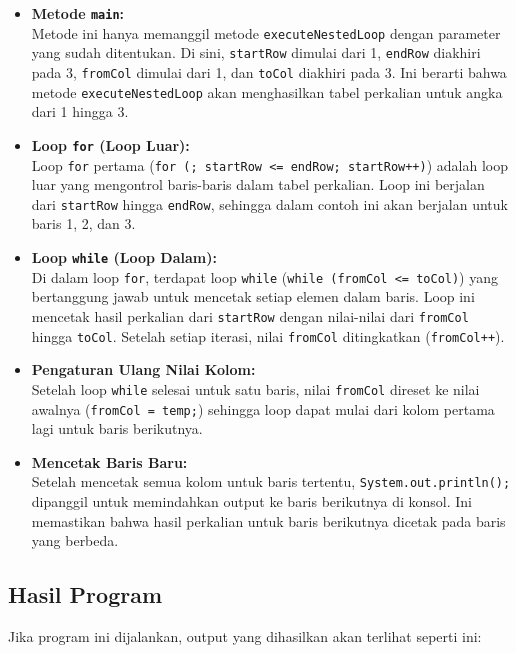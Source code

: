 \begin{itemize}
	\item \textbf{Metode \texttt{main}:}\\
	Metode ini hanya memanggil metode \texttt{executeNestedLoop} dengan parameter yang sudah ditentukan. Di sini, \texttt{startRow} dimulai dari 1, \texttt{endRow} diakhiri pada 3, \texttt{fromCol} dimulai dari 1, dan \texttt{toCol} diakhiri pada 3. Ini berarti bahwa metode \texttt{executeNestedLoop} akan menghasilkan tabel perkalian untuk angka dari 1 hingga 3.
	
	\item \textbf{Loop \texttt{for} (Loop Luar):} \\
	Loop \texttt{for} pertama (\texttt{for (; startRow <= endRow; startRow++)}) adalah loop luar yang mengontrol baris-baris dalam tabel perkalian. Loop ini berjalan dari \texttt{startRow} hingga \texttt{endRow}, sehingga dalam contoh ini akan berjalan untuk baris 1, 2, dan 3.
	
	\item \textbf{Loop \texttt{while} (Loop Dalam):} \\
	Di dalam loop \texttt{for}, terdapat loop \texttt{while} (\texttt{while (fromCol <= toCol)}) yang bertanggung jawab untuk mencetak setiap elemen dalam baris. Loop ini mencetak hasil perkalian dari \texttt{startRow} dengan nilai-nilai dari \texttt{fromCol} hingga \texttt{toCol}. Setelah setiap iterasi, nilai \texttt{fromCol} ditingkatkan (\texttt{fromCol++}).
	
	\item \textbf{Pengaturan Ulang Nilai Kolom:} \\
	Setelah loop \texttt{while} selesai untuk satu baris, nilai \texttt{fromCol} direset ke nilai awalnya (\texttt{fromCol = temp;}) sehingga loop dapat mulai dari kolom pertama lagi untuk baris berikutnya.
	
	\item \textbf{Mencetak Baris Baru:} \\
	Setelah mencetak semua kolom untuk baris tertentu, \texttt{System.out.println();} dipanggil untuk memindahkan output ke baris berikutnya di konsol. Ini memastikan bahwa hasil perkalian untuk baris berikutnya dicetak pada baris yang berbeda.
\end{itemize}

\subsection{Hasil Program}
Jika program ini dijalankan, output yang dihasilkan akan terlihat seperti ini:

